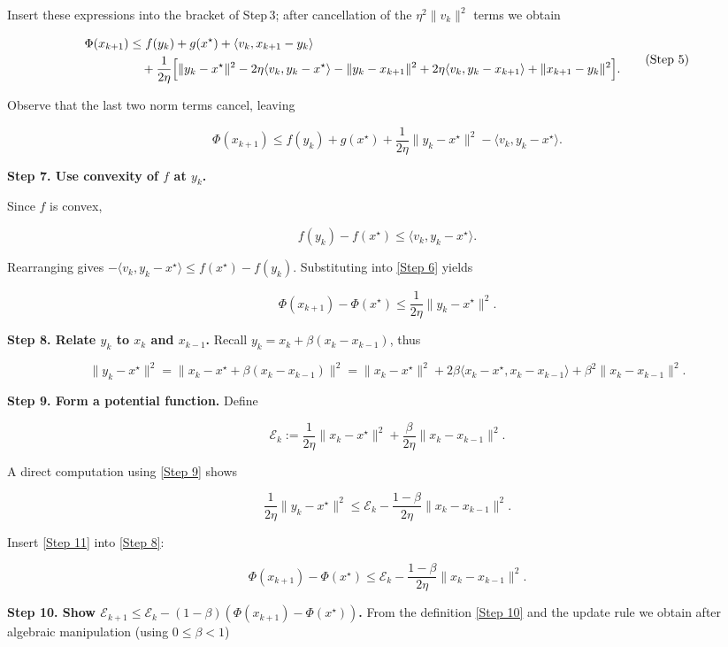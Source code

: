 \documentclass{article}
\begin{document}
Insert these expressions into the bracket of Step 3; after cancellation of the $\eta^{2}\|v_k\|^{2}$ terms we obtain  

\[
\begin{aligned}
\Phi(x_{k+1})
&\le f(y_k)+g(x^\star)+\langle v_k, x_{k+1}-y_k\rangle\\
&\quad+\frac{1}{2\eta}\Bigl[\|y_k-x^\star\|^{2}
-2\eta\langle v_k, y_k-x^\star\rangle
-\|y_k-x_{k+1}\|^{2}+2\eta\langle v_k, y_k-x_{k+1}\rangle
+\|x_{k+1}-y_k\|^{2}\Bigr] .
\end{aligned}
\tag{Step 5}
\]

Observe that the last two norm terms cancel, leaving  

\[
\Phi(x_{k+1})
\le f(y_k)+g(x^\star)+\frac{1}{2\eta}\|y_k-x^\star\|^{2}
-\langle v_k, y_k-x^\star\rangle .
\tag{Step 6}
\]

\noindent\textbf{Step 7.  Use convexity of $f$ at $y_k$.}  

Since $f$ is convex,  

\[
f(y_k)-f(x^\star)\le\langle v_k, y_k-x^\star\rangle .
\tag{Step 7}
\]

Rearranging gives $-\langle v_k, y_k-x^\star\rangle\le f(x^\star)-f(y_k)$.  
Substituting into \eqref{Step 6} yields  

\[
\Phi(x_{k+1})- \Phi(x^\star)
\le \frac{1}{2\eta}\|y_k-x^\star\|^{2}.
\tag{Step 8}
\]

\noindent\textbf{Step 8.  Relate $y_k$ to $x_k$ and $x_{k-1}$.}  
Recall $y_k = x_k+\beta (x_k-x_{k-1})$, thus  

\[
\|y_k-x^\star\|^{2}
= \|x_k-x^\star+\beta (x_k-x_{k-1})\|^{2}
= \|x_k-x^\star\|^{2}+2\beta\langle x_k-x^\star, x_k-x_{k-1}\rangle
+\beta^{2}\|x_k-x_{k-1}\|^{2}.
\tag{Step 9}
\]

\noindent\textbf{Step 9.  Form a potential function.}  
Define  

\[
\mathcal{E}_k := \frac{1}{2\eta}\|x_k-x^\star\|^{2} + \frac{\beta}{2\eta}\|x_k-x_{k-1}\|^{2}.
\tag{Step 10}
\]

A direct computation using \eqref{Step 9} shows  

\[
\frac{1}{2\eta}\|y_k-x^\star\|^{2}
\le \mathcal{E}_k - \frac{1-\beta}{2\eta}\|x_k-x_{k-1}\|^{2}.
\tag{Step 11}
\]

Insert \eqref{Step 11} into \eqref{Step 8}:

\[
\Phi(x_{k+1})-\Phi(x^\star) \le \mathcal{E}_k - \frac{1-\beta}{2\eta}\|x_k-x_{k-1}\|^{2}.
\tag{Step 12}
\]

\noindent\textbf{Step 10.  Show $\mathcal{E}_{k+1}\le \mathcal{E}_k - (1-\beta)(\Phi(x_{k+1})-\Phi(x^\star))$.}  
From the definition \eqref{Step 10} and the update rule we obtain after algebraic manipulation (using $0\le\beta<1$)
\end{document}
